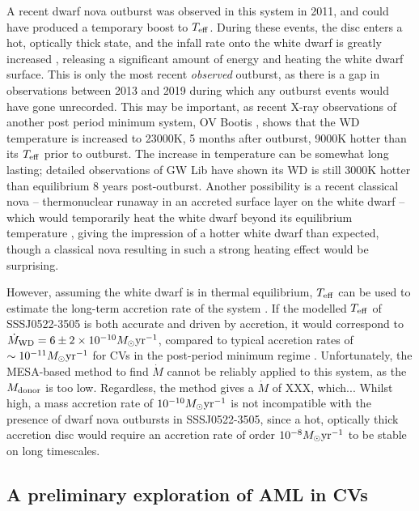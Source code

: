 A recent dwarf nova outburst was observed in this system in 2011, and could have produced a temporary boost to $T_{\rm eff}$. During these events, the disc enters a hot, optically thick state, and the infall rate onto the white dwarf is greatly increased \citep{osaki1996}, releasing a significant amount of energy and heating the white dwarf surface.
This is only the most recent \textit{observed} outburst, as there is a gap in observations between 2013 and 2019 during which any outburst events would have gone unrecorded. This may be important, as recent X-ray observations of another post period minimum system, OV Bootis \citep{Schwope2021}, shows that the WD temperature is increased to 23000K, 5 months after outburst, 9000K hotter than its $T_{\rm eff}$ prior to outburst. The increase in temperature can be somewhat long lasting; detailed observations of GW Lib have shown its WD is still 3000K hotter than equilibrium 8 years post-outburst\citep{Szkody2016}.
Another possibility is a recent classical nova -- thermonuclear runaway in an accreted surface layer on the white dwarf -- which would temporarily heat the white dwarf beyond its equilibrium temperature \citep{starrfield2016}, giving the impression of a hotter white dwarf than expected, though a classical nova resulting in such a strong heating effect would be surprising.

However, assuming the white dwarf is in thermal equilibrium, $T_{\rm eff}$ can be used to estimate the long-term accretion rate of the system \citep{townsley2009}.
If the modelled $T_{\rm eff}$ of SSSJ0522-3505 is both accurate and driven by accretion, it would correspond to $\dot M_{\rm WD} = 6\pm2 \times 10^{-10} M_\odot {\rm yr^{-1}}$, compared to typical accretion rates of $\sim10^{-11} M_\odot {\rm yr^{-1}}$ for CVs in the post-period minimum regime \citep{Pala2017a}. Unfortunately, the MESA-based method to find $\dot M$ cannot be reliably applied to this system, as the $M_{\rm donor}$ is too low. Regardless, the method gives a $\dot M$ of XXX, which...
Whilst high, a mass accretion rate of $10^{-10} M_\odot {\rm yr^{-1}}$ is not incompatible with the presence of dwarf nova outbursts in SSSJ0522-3505, since a hot, optically thick accretion disc would require an accretion rate of order $10^{-8} M_\odot {\rm yr^{-1}}$ \citep{Hameury1998} to be stable on long timescales.



\subsection{A preliminary exploration of AML in CVs}
\label{sect:discussion AML}

